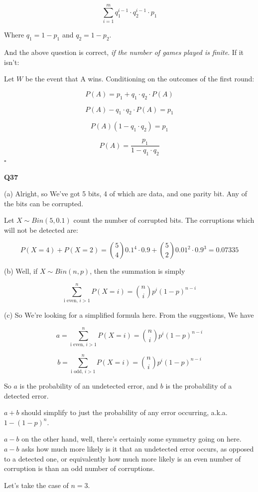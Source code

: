\documentclass{article}
\newcommand{\qed}{\hfill$\square$}
\begin{document}
			$$\sum^m_{i=1} q_1^{i-1}\cdot q_2^{i-1}\cdot p_1$$
			
			Where $q_1 = 1-p_1$ and $q_2 = 1-p_2$.
			
			And the above question is correct, \textit{if the number of games played is finite}. If it isn't:
			
			Let $W$ be the event that A wins. Conditioning on the outcomes of the first round:
			
			$$P(A) = p_1 + q_1\cdot q_2 \cdot P(A)$$
			
			$$P(A) - q_1\cdot q_2 \cdot P(A) = p_1$$
			
			$$P(A)(1 - q_1\cdot q_2) = p_1$$
			
			$$P(A) = \frac{p_1}{1 - q_1\cdot q_2}$$\qed
			
			\hfill
			
		\textbf{Q37}
		
			(a) Alright, so We've got 5 bits, 4 of which are data, and one parity bit. Any of the bits can be corrupted. 
			
			Let $X \sim Bin(5, 0.1)$ count the number of corrupted bits. The corruptions which will not be detected are: 
			
			$$P(X = 4) + P(X = 2) = {5 \choose 4}0.1^4\cdot 0.9 + {5 \choose 2}0.01^2\cdot 0.9^3 = 0.07335$$
			
			(b) Well, if $X \sim Bin(n, p)$, then the summation is simply
			
			$$\sum_{\text{i even, }i > 1}^n P(X = i) = {n \choose i}p^i(1-p)^{n-i}$$
			
			(c) So We're looking for a simplified formula here. From the suggestions, We have
			
			$$a = \sum_{\text{i even, }i > 1}^n P(X = i) = {n \choose i}p^i(1-p)^{n-i}$$
			
			$$b = \sum_{\text{i odd, }i > 1}^n P(X = i) = {n \choose i}p^i(1-p)^{n-i}$$
			
			So $a$ is the probability of an undetected error, and $b$ is the probability of a detected error. 
			
			$a+b$ should simplify to just the probability of any error occurring, a.k.a. $1 - (1-p)^n$.
			
			$a-b$ on the other hand, well, there's certainly some symmetry going on here. $a-b$ asks how much more likely is it that an undetected error occurs, as opposed to a detected one, or equivalently how much more likely is an even number of corruption is than an odd number of corruptions.
			
			Let's take the case of $n=3$. 
			
\end{document}
